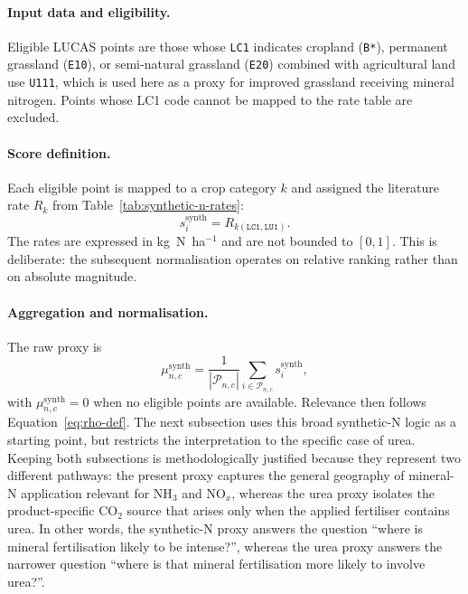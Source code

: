 \paragraph{Input data and eligibility.}
Eligible LUCAS points are those whose \texttt{LC1} indicates cropland
(\texttt{B*}), permanent grassland (\texttt{E10}), or semi-natural
grassland (\texttt{E20}) combined with agricultural land use
\texttt{U111}, which is used here as a proxy for improved grassland
receiving mineral nitrogen. Points whose LC1 code cannot be mapped to
the rate table are excluded.

\paragraph{Score definition.}
Each eligible point is mapped to a crop category $k$ and assigned the
literature rate $R_k$ from Table~\ref{tab:synthetic-n-rates}:
\begin{equation}
  s_i^{\mathrm{synth}} = R_{k(\texttt{LC1},\texttt{LU1})}.
\end{equation}
The rates are expressed in kg~N~ha$^{-1}$ and are not bounded to
$[0,1]$. This is deliberate: the subsequent normalisation operates on
relative ranking rather than on absolute magnitude.

\paragraph{Aggregation and normalisation.}
The raw proxy is
\begin{equation}
  \mu_{n,c}^{\mathrm{synth}} =
  \frac{1}{|\mathcal{P}_{n,c}|}
  \sum_{i \in \mathcal{P}_{n,c}} s_i^{\mathrm{synth}},
\end{equation}
with $\mu_{n,c}^{\mathrm{synth}}=0$ when no eligible points are
available. Relevance then follows Equation~\ref{eq:rho-def}. The next
subsection uses this broad synthetic-N logic as a starting point, but
restricts the interpretation to the specific case of urea. Keeping both
subsections is methodologically justified because they represent two
different pathways: the present proxy captures the general geography of
mineral-N application relevant for NH$_3$ and NO$_x$, whereas the urea
proxy isolates the product-specific CO$_2$ source that arises only when
the applied fertiliser contains urea. In other words, the synthetic-N
proxy answers the question ``where is mineral fertilisation likely to be
intense?'', whereas the urea proxy answers the narrower question
``where is that mineral fertilisation more likely to involve urea?''.

